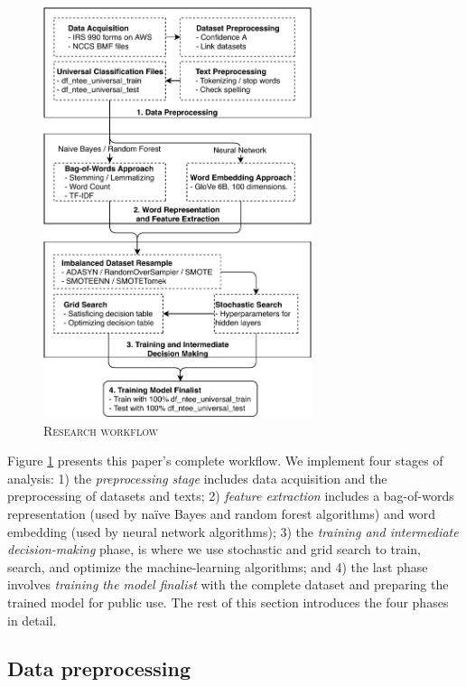 \documentclass[11pt]{article}
\begin{document}
\begin{figure}
	\centering
	\caption{\textsc{Research workflow}} \label{fig:workflow}
	\includegraphics[width=0.7\textwidth]{tbl_fig/ntee_classification.pdf}
\end{figure}

Figure \ref{fig:workflow} presents this paper's complete workflow. We implement four stages of analysis: 1) the \textit{preprocessing stage} includes data acquisition and the preprocessing of datasets and texts; 2) \textit{feature extraction} includes a bag-of-words representation (used by na\"ive Bayes and random forest algorithms) and word embedding (used by neural network algorithms); 3) the \textit{training and intermediate decision-making} phase, is where we use stochastic and grid search to train, search, and optimize the machine-learning algorithms; and 4) the last phase involves \textit{training the model finalist} with the complete dataset and preparing the trained model for public use. The rest of this section introduces the four phases in detail.

\subsection{Data preprocessing}
\end{document}
